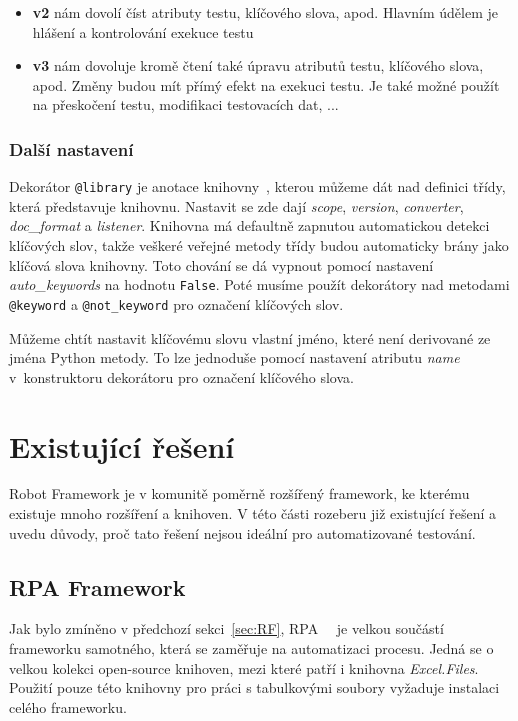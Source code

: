 \begin{itemize}
    \item \textbf{v2} nám dovolí číst atributy testu, klíčového slova, apod. Hlavním údělem je hlášení a kontrolování exekuce testu
    \item \textbf{v3} nám dovoluje kromě čtení také úpravu atributů testu, klíčového slova, apod. Změny budou mít přímý efekt na exekuci testu. Je také možné použít na přeskočení testu, modifikaci testovacích dat, ... 
\end{itemize}

\subsubsection{Další nastavení}

Dekorátor \texttt{@library} je anotace knihovny~\cite{robotframeworkUserGuide}, kterou můžeme dát nad definici třídy, která představuje knihovnu. Nastavit se zde dají \textit{scope}, \textit{version}, \textit{converter}, \textit{doc\_format} a \textit{listener}. Knihovna má defaultně zapnutou automatickou detekci klíčových slov, takže veškeré veřejné metody třídy budou automaticky brány jako klíčová slova knihovny. Toto chování se dá vypnout pomocí nastavení \textit{auto\_keywords} na hodnotu \texttt{False}. Poté musíme použít dekorátory nad metodami \texttt{@keyword} a \texttt{@not\_keyword} pro označení klíčových slov.

Můžeme chtít nastavit klíčovému slovu vlastní jméno, které není derivované ze jména Python metody. To lze jednoduše pomocí nastavení atributu \textit{name} v~konstruktoru dekorátoru pro označení klíčového slova.

\section{Existující řešení}

Robot Framework je v komunitě poměrně rozšířený framework, ke kterému existuje mnoho rozšíření a knihoven. V této části rozeberu již existující řešení a uvedu důvody, proč tato řešení nejsou ideální pro automatizované testování.

\subsection{RPA Framework}

Jak bylo zmíněno v předchozí sekci~\ref{sec:RF}, RPA~\cite{RPADocs}~\cite{RPAGH} je velkou součástí frameworku samotného, která se zaměřuje na automatizaci procesu. Jedná se o velkou kolekci open-source knihoven, mezi které patří i knihovna \textit{Excel.Files}.~\cite{RPAFiles} Použití pouze této knihovny pro práci s tabulkovými soubory vyžaduje instalaci celého frameworku.

